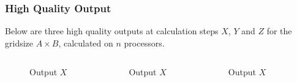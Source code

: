 \documentclass[8pt]{beamer}
\begin{document}
\begin{frame}
	\frametitle{High Quality Output}
	Below are three high quality outputs at calculation steps $X$, $Y$ and $Z$ for the gridsize $A \times B$, calculated on $n$ processors.
	\begin{columns}
		\begin{figure}
			\begin{center}
				\caption{Output $X$}
			\end{center}
		\end{figure}
		\begin{figure}
			\begin{center}
				\caption{Output $X$}
			\end{center}
		\end{figure}
		\begin{figure}
			\begin{center}
				\caption{Output $X$}
			\end{center}
		\end{figure}
	\end{columns}
\end{frame}
\end{document}
